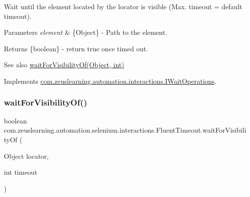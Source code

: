 Wait until the element located by the locator is visible (Max. timeout = default timeout).


\begin{DoxyParams}{Parameters}
{\em element} & \{Object\} -\/ Path to the element. \\
\hline
\end{DoxyParams}
\begin{DoxyReturn}{Returns}
\{boolean\} -\/ return {\ttfamily true} once timed out.
\end{DoxyReturn}
\begin{DoxySeeAlso}{See also}
\hyperlink{classcom_1_1zeuslearning_1_1automation_1_1selenium_1_1interactions_1_1FluentTimeout_aa8a8afef31ddc1e6bcd5238005a732ec}{wait\+For\+Visibility\+Of(\+Object, int)} 
\end{DoxySeeAlso}


Implements \hyperlink{interfacecom_1_1zeuslearning_1_1automation_1_1interactions_1_1IWaitOperations_ad52fa72b8387c5172714bdec02b754a9}{com.\+zeuslearning.\+automation.\+interactions.\+I\+Wait\+Operations}.

\hypertarget{classcom_1_1zeuslearning_1_1automation_1_1selenium_1_1interactions_1_1FluentTimeout_aa8a8afef31ddc1e6bcd5238005a732ec}{}\label{classcom_1_1zeuslearning_1_1automation_1_1selenium_1_1interactions_1_1FluentTimeout_aa8a8afef31ddc1e6bcd5238005a732ec} 
\subsubsection{\texorpdfstring{wait\+For\+Visibility\+Of()}{waitForVisibilityOf()}\hspace{0.1cm}{\footnotesize\ttfamily [2/2]}}
{\footnotesize\ttfamily boolean com.\+zeuslearning.\+automation.\+selenium.\+interactions.\+Fluent\+Timeout.\+wait\+For\+Visibility\+Of (\begin{DoxyParamCaption}\item[{Object}]{locator,  }\item[{int}]{timeout }\end{DoxyParamCaption})\hspace{0.3cm}{\ttfamily [inline]}}

